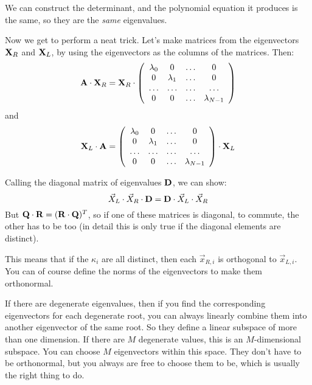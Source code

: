 
\begin{answer}
We can construct the determinant, and the polynomial equation it
produces is the same, so they are the {\it same} eigenvalues.
\end{answer}

Now we get to perform a neat trick. Let's make matrices from the
eigenvectors ${\bf X}_R$ and ${\bf X}_L$, by using the eigenvectors as
the columns of the matrices.  Then:
\begin{equation}
  {\bf A}\cdot{\bf X}_R = {\bf X}_R \cdot
  \left(
  \begin{array}{cccc}
    \lambda_0 & 0 & \ldots & 0 \cr
    0 & \lambda_1 & \ldots & 0 \cr
    \ldots & \ldots & \ldots & \ldots \cr
    0 & 0 & \ldots & \lambda_{N-1} \cr
  \end{array}
  \right)
\end{equation}
and
\begin{equation}
  {\bf X}_L \cdot {\bf A} = 
  \left(
  \begin{array}{cccc}
    \lambda_0 & 0 & \ldots & 0 \cr
    0 & \lambda_1 & \ldots & 0 \cr
    \ldots & \ldots & \ldots & \ldots \cr
    0 & 0 & \ldots & \lambda_{N-1} \cr
  \end{array}
  \right) \cdot {\bf X}_L
\end{equation}

Calling the diagonal matrix of eigenvalues ${\bf D}$, we can show:
\begin{equation}
\vec{X}_L \cdot \vec{X}_R \cdot {\bf D} 
= {\bf D} \cdot \vec{X}_L \cdot \vec{X}_R
\end{equation}
But ${\bf Q}\cdot{\bf R} = ({\bf R}\cdot{\bf Q})^T$, so if one of
these matrices is diagonal, to commute, the other has to be too (in
detail this is only true if the diagonal elements are distinct). 

This means that if the $\kappa_i$ are all distinct, then each
$\vec{x}_{R,i}$ is orthogonal to $\vec{x}_{L,i}$. You can of course
define the norms of the eigenvectors to make them orthonormal. 

If there are degenerate eigenvalues, then if you find the
corresponding eigenvectors for each degenerate root, you can always
linearly combine them into another eigenvector of the same root. So
they define a linear subspace of more than one dimension. If there are
$M$ degenerate values, this is an $M$-dimensional subspace. You can
choose $M$ eigenvectors within this space. They don't have to be
orthonormal, but you always are free to choose them to be, which is
usually the right thing to do.

